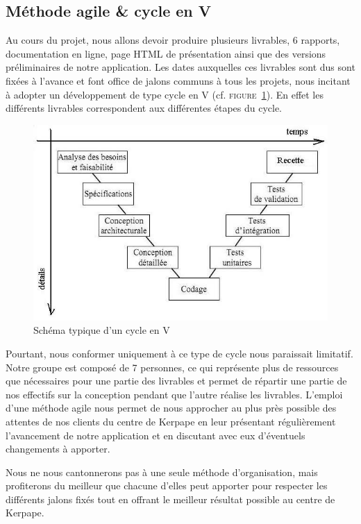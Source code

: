 \subsection{Méthode agile \& cycle en V}
Au cours du projet, nous allons devoir produire plusieurs livrables, 6 rapports, documentation en ligne, page HTML de présentation ainsi que des versions préliminaires de notre application. Les dates auxquelles ces livrables sont dus sont fixées à l'avance et font office de jalons communs à tous les projets, nous incitant à adopter un développement de type cycle en V (cf. \textsc{figure~\ref{cycle_v}}). En effet les différents livrables correspondent aux différentes étapes du cycle. \newline
\begin{figure}[ht]
  \centering
  \includegraphics[width=\linewidth]{3-Planification/img-utilisateur/cycle_v}
  \caption{Schéma typique d'un cycle en V}
  \label{cycle_v}
\end{figure}

Pourtant, nous conformer uniquement à ce type de cycle nous paraissait limitatif. Notre groupe est composé de 7 personnes, ce qui représente plus de ressources que nécessaires pour une partie des livrables et permet de répartir une partie de nos effectifs sur la conception pendant que l'autre réalise les livrables. L'emploi d'une méthode agile nous permet de nous approcher au plus près possible des attentes de nos clients du centre de Kerpape en leur présentant régulièrement l'avancement de notre application et en discutant avec eux d'éventuels changements à apporter.\newline

Nous ne nous cantonnerons pas à une seule méthode d'organisation, mais profiterons du meilleur que chacune d'elles peut apporter pour respecter les différents jalons fixés tout en offrant le meilleur résultat possible au centre de Kerpape. 

